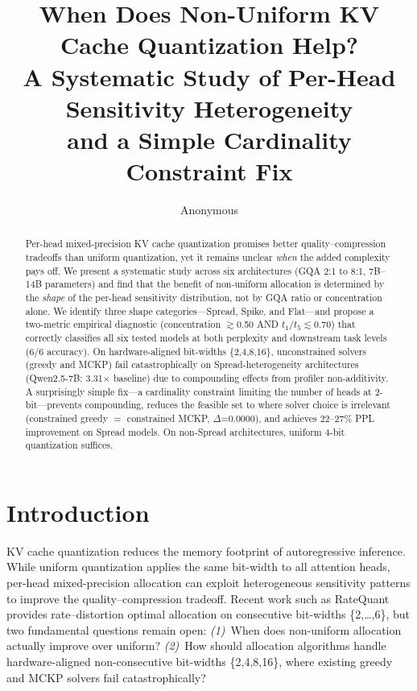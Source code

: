 \documentclass[11pt,a4paper]{article}
\title{When Does Non-Uniform KV Cache Quantization Help?\\A Systematic Study of Per-Head Sensitivity Heterogeneity\\and a Simple Cardinality Constraint Fix}
\author{Anonymous}
\date{}
\newcommand{\ttf}{t_1/t_5}
\begin{document}
\maketitle

\begin{abstract}
Per-head mixed-precision KV cache quantization promises better quality--compression tradeoffs than uniform quantization, yet it remains unclear \emph{when} the added complexity pays off.
We present a systematic study across six architectures (GQA 2:1 to 8:1, 7B--14B parameters) and find that the benefit of non-uniform allocation is determined by the \emph{shape} of the per-head sensitivity distribution, not by GQA ratio or concentration alone.
We identify three shape categories---Spread, Spike, and Flat---and propose a two-metric empirical diagnostic (concentration $\gtrsim$0.50 AND $\ttf\lesssim$0.70) that correctly classifies all six tested models at both perplexity and downstream task levels (6/6 accuracy).
On hardware-aligned bit-widths \{2,4,8,16\}, unconstrained solvers (greedy and MCKP) fail catastrophically on Spread-heterogeneity architectures (Qwen2.5-7B: 3.31$\times$ baseline) due to compounding effects from profiler non-additivity.
A surprisingly simple fix---a cardinality constraint limiting the number of heads at 2-bit---prevents compounding, reduces the feasible set to where solver choice is irrelevant (constrained greedy $=$ constrained MCKP, $\Delta$=0.0000), and achieves 22--27\% PPL improvement on Spread models.
On non-Spread architectures, uniform 4-bit quantization suffices.
\end{abstract}

\section{Introduction}

KV cache quantization reduces the memory footprint of autoregressive inference.
While uniform quantization applies the same bit-width to all attention heads, per-head mixed-precision allocation can exploit heterogeneous sensitivity patterns to improve the quality--compression tradeoff.
Recent work such as RateQuant~\cite{ratequant2026} provides rate--distortion optimal allocation on consecutive bit-widths \{2,\ldots,6\}, but two fundamental questions remain open:
\emph{(1)}~When does non-uniform allocation actually improve over uniform?
\emph{(2)}~How should allocation algorithms handle hardware-aligned non-consecutive bit-widths \{2,4,8,16\}, where existing greedy and MCKP solvers fail catastrophically?
\end{document}
